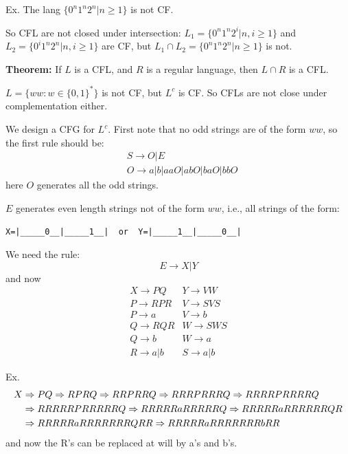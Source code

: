 \begin{frame}
Ex. The lang $\{0^n1^n2^n|n\ge 1\}$ is not CF.

So CFL are not closed under intersection:
$L_1=\{0^n1^n2^i|n,i\ge 1\}$ and 
$L_2=\{0^i1^n2^n|n,i\ge 1\}$ are CF, but $L_1\cap L_2=\{0^n1^n2^n|n\ge
1\}$ is not.

{\bf Theorem:} If $L$ is a CFL, and $R$ is a regular language, then
$L\cap R$ is a CFL.

\end{frame}

\begin{frame}[fragile]

$L=\{ww:w\in\{0,1\}^*\}$ is not CF, but $L^c$ is CF.  So CFLs are not
close under complementation either.

We design a CFG for $L^c$.  First note that no odd strings are of the
form $ww$, so the first rule should be:
\begin{align*}
& S\longrightarrow O|E \\
& O\longrightarrow a|b|aaO|abO|baO|bbO
\end{align*}
here $O$ generates all the odd strings.  

$E$ generates
even length strings not of the form $ww$, i.e., all strings of the
form:
\begin{verbatim}
X=|_____0__|_____1__|  or  Y=|_____1__|_____0__|
\end{verbatim}
\end{frame}

\begin{frame}
We need the rule:
$$
E\longrightarrow X|Y
$$
and now
$$
\begin{array}{ll}
X\longrightarrow PQ   &  Y\longrightarrow VW  \\
P\longrightarrow RPR  &  V\longrightarrow SVS \\
P\longrightarrow a    &  V\longrightarrow b   \\
Q\longrightarrow RQR  &  W\longrightarrow SWS \\
Q\longrightarrow b    &  W\longrightarrow a   \\
R\longrightarrow a|b  &  S\longrightarrow a|b
\end{array}
$$

Ex.
\begin{align*}
X &\Rightarrow PQ\Rightarrow RPRQ\Rightarrow RRPRRQ\Rightarrow RRRPRRRQ\Rightarrow RRRRPRRRRQ \\
  &\Rightarrow RRRRRPRRRRRQ \Rightarrow RRRRRaRRRRRQ\Rightarrow RRRRRaRRRRRRQR \\
  &\Rightarrow RRRRRaRRRRRRRQRR \Rightarrow RRRRRaRRRRRRRbRR
\end{align*}
and now the R's can be replaced at will by a's and b's.
\end{frame}

